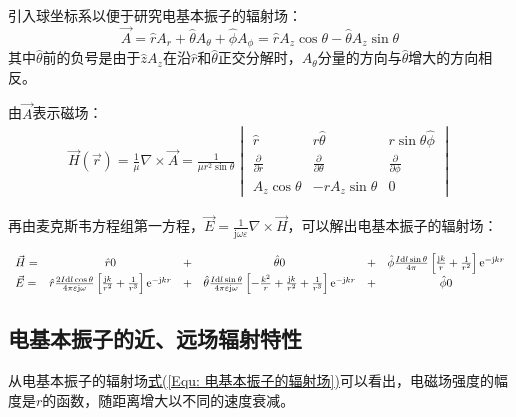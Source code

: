         引入球坐标系以便于研究电基本振子的辐射场：
        \begin{equation}
            \vec{A}=\hat{r}A_r+\hat{\theta}A_\theta+\hat{\phi}A_\phi=\hat{r}A_z\cos\theta-\hat{\theta}A_z\sin\theta
        \end{equation}
        其中$\hat{\theta}$前的负号是由于$\hat{z}A_z$在沿$\hat{r}$和$\hat{\theta}$正交分解时，$A_\theta$分量的方向与$\hat{\theta}$增大的方向相反。

        由$\vec{A}$表示磁场：
        \begin{equation}
            \begin{aligned}
                \vec{H}(\vec{r})=\frac{1}{\mu}\nabla\times \vec{A}
                =\frac{1}{\mu r^2\sin\theta}\begin{vmatrix}
                    \hat{r}&r\hat{\theta}&r\sin\theta\hat{\phi}\\
                    \frac{\partial }{\partial r}&\frac{\partial }{\partial \theta}&\frac{\partial }{\partial \phi}\\
                    A_z\cos\theta&-rA_z\sin\theta&0
                \end{vmatrix}
            \end{aligned}
        \end{equation}

        再由麦克斯韦方程组第一方程，$\vec{E}=\frac{1}{\mathrm{j}\omega \varepsilon}\nabla\times \vec{H}$，可以解出电基本振子的辐射场：

        \begin{equation}\label{Equ: 电基本振子的辐射场}
            \begin{array}{l c cc cc}
                \vec{H}=&\hat{r}0 &+&\hat{\theta}0&+&\hat{\phi}\frac{I \mathrm{d}l\sin\theta}{4\pi}\left[\frac{\mathrm{j}k}{r}+\frac{1}{r^2}\right]\mathrm{e}^{-\mathrm{j}k r}\\
                \vec{E}=&\hat{r}\frac{2I \mathrm{d}l\cos\theta}{4\pi \varepsilon \mathrm{j}\omega}\left[\frac{\mathrm{j}k}{r^2}+\frac{1}{r^3}\right]\mathrm{e}^{-\mathrm{j}k r} &+&\hat{\theta}\frac{I \mathrm{d}l\sin\theta}{4\pi \varepsilon \mathrm{j}\omega}\left[-\frac{k^2}{r}+\frac{\mathrm{j}k}{r^2}+\frac{1}{r^3}\right]\mathrm{e}^{-\mathrm{j}k r}&+&\hat{\phi}0\\
            \end{array}
        \end{equation}

    \subsection{电基本振子的近、远场辐射特性}
        从电基本振子的辐射场\hyperref[Equ: 电基本振子的辐射场]{式(\ref*{Equ: 电基本振子的辐射场})}可以看出，电磁场强度的幅度是$r$的函数，随距离增大以不同的速度衰减。

